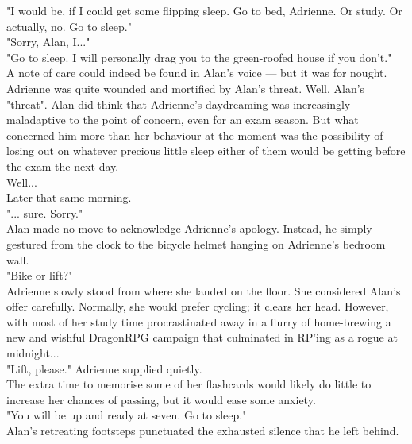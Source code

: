 "I would be, if I could get some flipping sleep. Go to bed, Adrienne. Or study. Or actually, no. Go to sleep."\\

"Sorry, Alan, I..."\\

"Go to sleep. I will personally drag you to the green-roofed house if you don't."\\

A note of care could indeed be found in Alan's voice --- but it was for nought. Adrienne was quite wounded and mortified by Alan's threat.
Well, Alan's "threat". Alan did think that Adrienne's daydreaming was increasingly maladaptive to the point of concern, even for an exam season.
But what concerned him more than her behaviour at the moment was the possibility of losing out on whatever precious little sleep either of them would be getting before the exam the next day.\\

Well...\\

Later that same morning.\\

"... sure. Sorry."\\

Alan made no move to acknowledge Adrienne's apology.
Instead, he simply gestured from the clock to the bicycle helmet hanging on Adrienne's bedroom wall.\\

"Bike or lift?"\\

Adrienne slowly stood from where she landed on the floor. 
She considered Alan's offer carefully. 
Normally, she would prefer cycling; it clears her head.
However, with most of her study time procrastinated away in a flurry of home-brewing a new and wishful DragonRPG campaign that culminated in RP'ing as a rogue at midnight...\\

"Lift, please." Adrienne supplied quietly.\\

The extra time to memorise some of her flashcards would likely do little to increase her chances of passing, but it would ease some anxiety.\\

"You will be up and ready at seven. Go to sleep."\\

Alan's retreating footsteps punctuated the exhausted silence that he left behind.\\

